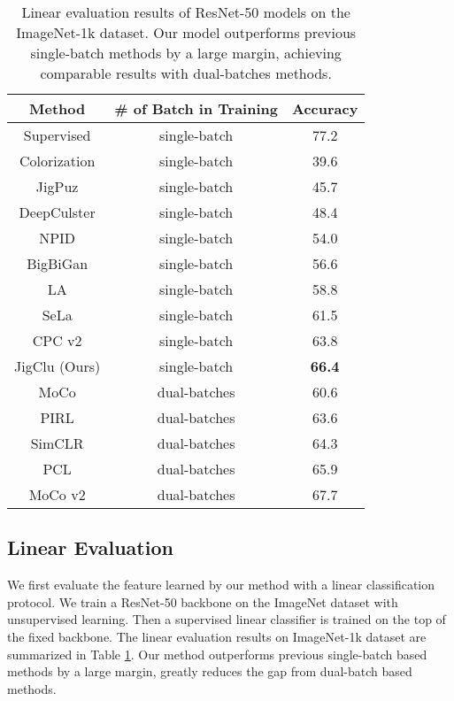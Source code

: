 \documentclass[final]{cvpr}
\begin{document}
\begin{table}
	\centering
	\begin{tabular}{c c c}
		\toprule
		Method & \# of Batch in Training & Accuracy \\
		\midrule
		Supervised & single-batch & 77.2 \\ 
		\midrule
		Colorization \cite{colorization} & single-batch & 39.6 \\
		JigPuz \cite{jigpuz} & single-batch & 45.7 \\
		DeepCulster \cite{deepcluster} & single-batch & 48.4 \\
		NPID \cite{npid} & single-batch & 54.0 \\
		BigBiGan \cite{bigbigan} & single-batch & 56.6 \\
		LA \cite{la} & single-batch & 58.8 \\
		SeLa \cite{sela} & single-batch & 61.5 \\ 
		CPC v2 \cite{cpcv2} & single-batch & 63.8 \\
		JigClu (Ours) & single-batch & \textbf{66.4} \\
		\midrule
		MoCo \cite{moco} & dual-batches & 60.6 \\
		PIRL \cite{pirl} & dual-batches & 63.6 \\
		SimCLR \cite{simclr} & dual-batches & 64.3 \\
		PCL \cite{pcl} & dual-batches & 65.9 \\
		MoCo v2 \cite{mocov2} & dual-batches & 67.7 \\
		\bottomrule
	\end{tabular}
	\vspace{0.1in}
	\caption{Linear evaluation results of ResNet-50 models on the ImageNet-1k dataset. Our model outperforms previous single-batch methods by a large margin, achieving comparable results with dual-batches methods.}
	\label{tab:linear-1k}
\end{table}

\subsection{Linear Evaluation}
We first evaluate the feature learned by our method with a linear classification protocol. 
We train a ResNet-50 backbone on the ImageNet dataset with unsupervised learning. Then a supervised linear classifier is trained on the top of the fixed backbone. The linear evaluation results on ImageNet-1k dataset are summarized in Table \ref{tab:linear-1k}. Our method outperforms previous single-batch based methods by a large margin, greatly reduces the gap from dual-batch based methods.
\end{document}
